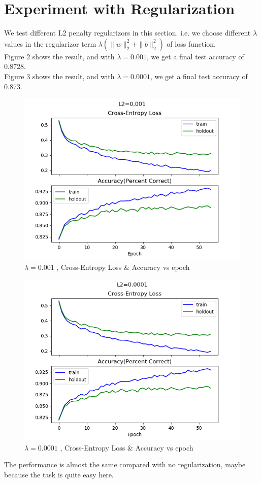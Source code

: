 \documentclass{article} %
\begin{document}
\section{Experiment with Regularization}
We test different L2 penalty regularizors in this section. i.e. we choose different $\lambda$ values in the regularizor term $\lambda (\parallel w \parallel_2^2+\parallel b \parallel_2^2)$ of loss function. \\
Figure 2 shows the result, and with $\lambda = 0.001$, we get a final test accuracy of 0.8728. \\
Figure 3 shows the result, and with  $\lambda = 0.0001$, we get a final test accuracy of 0.873. \\
\begin{figure}[h]	
	\centering
	\includegraphics[scale=0.5]{./plots/001Regular.png}
	\caption{$\lambda = 0.001$ , Cross-Entropy Loss \& Accuracy vs epoch}
\end{figure}
\begin{figure}[h]	
	\centering
	\includegraphics[scale=0.5]{./plots/0001Regular.png}
	\caption{$\lambda = 0.0001$ , Cross-Entropy Loss \& Accuracy vs epoch}
\end{figure}
The performance is almost the same compared with no regularization, maybe because the task is quite easy here. 
\end{document}
